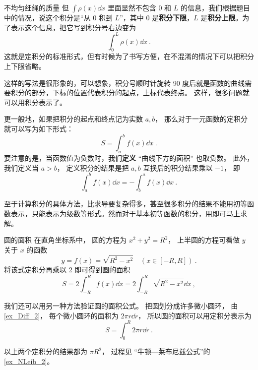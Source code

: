 \begin{example}{不均匀细绳的质量}
但 $\int \rho(x) \dd{x}$ 里面显然不包含 $0$ 和 $L$ 的信息，我们根据题目中的情况，说这个积分是“从 $0$ 积到 $L$”，其中 $0$ 是\textbf{积分下限}，$L$ 是\textbf{积分上限}。为了表示这个信息，把它写到积分号右边变为
\begin{equation}
\int_0^L \rho(x) \dd{x}~.
\end{equation}
这就是定积分的标准形式，但有时候为了书写方便，在不混淆的情况下可以把积分上下限省略。
\end{example}

这样的写法是很形象的，可以想象，积分号顺时针旋转 90 度后就是函数的曲线需要积分的部分，下标的位置代表积分的起点，上标代表终点。 这样，很多问题就可以用积分表示了。

更一般地，如果把积分的起点和终点记为实数 $a,b$， 那么对于一元函数的定积分就可以写为如下形式：
\begin{equation}
S=\int^b_a f(x) \dd x~.
\end{equation}
要注意的是，当函数值为负数时，我们\textbf{定义} “曲线下方的面积” 也取负数。 此外，我们定义当 $a > b$， 定义积分的结果是把 $a,b$ 互换后的积分结果乘以 $-1$， 即
\begin{equation}
\int^b_a f(x) \dd x = -\int^a_b f(x) \dd x~.
\end{equation}

至于计算积分的具体方法，比求导要复杂得多，甚至很多积分的结果不能用初等函数表示，只能表示为级数等形式。然而对于基本初等函数的积分，用即可马上求解。

\begin{example}{圆的面积}\label{ex_DefInt_2}
在直角坐标系中， 圆的方程为 $x^2 + y^2 = R^2$， 上半圆的方程可看做 $y$ 关于 $x$ 的函数
\begin{equation}
y = f(x) = \sqrt{R^2 - x^2} \quad (x\in [-R,R])~.
\end{equation}
将该式定积分再乘以 2 即可得到圆的面积
\begin{equation}
S = 2\int_{-R}^{R} f(x) \dd{x} = 2\int_{-R}^{R} \sqrt{R^2 - x^2} \dd{x}~,
\end{equation}

我们还可以用另一种方法验证圆的面积公式。 把圆划分成许多微小圆环， 由\autoref{ex_Diff_2}， 每个微小圆环的面积为 $2\pi r\dd{r}$， 所以圆的面积可以用定积分表示为
\begin{equation}
S = \int_0^{R} 2\pi r\dd{r}~.
\end{equation}

以上两个定积分的结果都为 $\pi R^2$， 过程见 “牛顿—莱布尼兹公式”的\autoref{ex_NLeib_2}。
\end{example}

